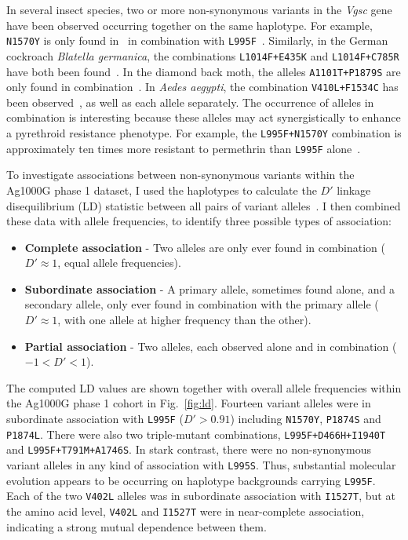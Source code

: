 \documentclass[a4paper,11pt,abstracton,hidelinks]{scrartcl}
\begin{document}
In several insect species, two or more non-synonymous variants in the \textit{Vgsc} gene have been observed occurring together on the same haplotype.
%
For example, \texttt{N1570Y} is only found in \agam\ in combination with \texttt{L995F}~\parencite{Jones2012}.
%
Similarly, in the German cockroach \textit{Blatella germanica}, the combinations \texttt{L1014F+E435K} and \texttt{L1014F+C785R} have both been found~\parencite{Tan2002}.
%
In the diamond back moth, the alleles \texttt{A1101T+P1879S} are only found in combination~\parencite{Sonoda2010}.
%
In \textit{Aedes aegypti}, the combination \texttt{V410L+F1534C} has been observed~\parencite{Haddi2017}, as well as each allele separately.
%
The occurrence of alleles in combination is interesting because these alleles may act synergistically to enhance a pyrethroid resistance phenotype.
%
For example, the \texttt{L995F+N1570Y} combination is approximately ten times more resistant to permethrin than \texttt{L995F} alone~\parencite{Wang2015}.


To investigate associations between non-synonymous variants within the Ag1000G phase 1 dataset, I used the haplotypes to calculate the $D'$ linkage disequilibrium (LD) statistic between all pairs of variant alleles~\parencite{Lewontin1964}.
%
I then combined these data with allele frequencies, to identify three possible types of association:
%
\begin{itemize}
    \item \textbf{Complete association} - Two alleles are only ever found in combination ($D' \approx 1$, equal allele frequencies).
    \item \textbf{Subordinate association} - A primary allele, sometimes found alone, and a secondary allele, only ever found in combination with the primary allele ($D' \approx 1$, with one allele at higher frequency than the other).
    \item \textbf{Partial association} - Two alleles, each observed alone and in combination ($-1 < D' < 1$).
\end{itemize}


The computed LD values are shown together with overall allele frequencies within the Ag1000G phase 1 cohort in Fig.~\ref{fig:ld}.
%
Fourteen variant alleles were in subordinate association with \texttt{L995F} ($D' > 0.91$) including \texttt{N1570Y}, \texttt{P1874S} and \texttt{P1874L}.
%
There were also two triple-mutant combinations, \texttt{L995F+D466H+I1940T} and \texttt{L995F+T791M+A1746S}.
%
In stark contrast, there were no non-synonymous variant alleles in any kind of association with \texttt{L995S}.
%
Thus, substantial molecular evolution appears to be occurring on haplotype backgrounds carrying \texttt{L995F}.
%
Each of the two \texttt{V402L} alleles was in subordinate association with \texttt{I1527T}, but at the amino acid level, \texttt{V402L} and \texttt{I1527T} were in near-complete association, indicating a strong mutual dependence between them.
\end{document}
